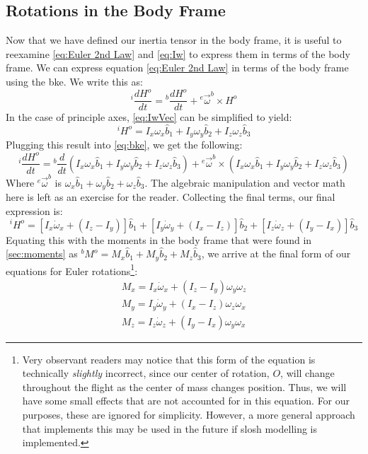 \documentclass[12pt]{report}
\begin{document}
\subsection{Rotations in the Body Frame}\label{sec:rotations in the body frame}
Now that we have defined our inertia tensor in the body frame, it is useful to reexamine \eqref{eq:Euler 2nd Law} and \eqref{eq:Iw} to express them in terms of the body frame.
We can express equation \eqref{eq:Euler 2nd Law} in terms of the body frame using the \gls{bke}. We write this as:
\begin{equation}\label{eq:bke}
{}^i\frac{dH^o}{dt}={}^b\frac{dH^o}{dt}+{}^e\vec{\omega}^b\times H^o
\end{equation}
In the case of principle axes, \eqref{eq:IwVec} can be simplified to yield:
$${}^iH^o=I_x\omega_x\hat{b}_1+I_y\omega_y\hat{b}_2+I_z\omega_z\hat{b}_3$$
Plugging this result into \eqref{eq:bke}, we get the following:
$${}^i\frac{dH^o}{dt}={}^b\frac{d}{dt}\left(I_x\omega_x\hat{b}_1+I_y\omega_y\hat{b}_2+I_z\omega_z\hat{b}_3\right)+{}^e\vec{\omega}^b\times \left(I_x\omega_x\hat{b}_1+I_y\omega_y\hat{b}_2+I_z\omega_z\hat{b}_3\right)$$
Where ${}^e\vec{\omega}^b$ is $\omega_x\hat{b}_1+\omega_y\hat{b}_2+\omega_z\hat{b}_3$. The algebraic manipulation and vector math here is left as an exercise for the reader. Collecting the final terms, our final expression is:
$${}^iH^o=\left[I_x\dot{\omega}_x+\left(I_z-I_y\right)\right]\hat{b}_1+\left[I_y\dot{\omega}_y+\left(I_x-I_z\right)\right]\hat{b}_2+\left[I_z\dot{\omega}_z+\left(I_y-I_x\right)\right]\hat{b}_3$$
Equating this with the moments in the body frame that were found in \ref{sec:moments} as ${}^bM^o=M_x\hat{b}_1+M_y\hat{b}_2+M_z\hat{b}_3$, we arrive at the final form of our equations for Euler rotations\footnote{Very observant readers may notice that this form of the equation is technically \textit{slightly} incorrect, since our center of rotation, $O$, will change throughout the flight as the center of mass changes position. Thus, we will have some small effects that are not accounted for in this equation. For our purposes, these are ignored for simplicity. However, a more general approach that implements this may be used in the future if slosh modelling is implemented.}:
\begin{gather}\label{eq: moment equations}
    M_x=I_x\dot{\omega}_x+\left(I_z-I_y\right)\omega_y\omega_z\\
    M_y=I_y\dot{\omega}_y+\left(I_x-I_z\right)\omega_z\omega_x\\
    M_z=I_z\dot{\omega}_z+\left(I_y-I_x\right)\omega_y\omega_x
\end{gather}
\end{document}
